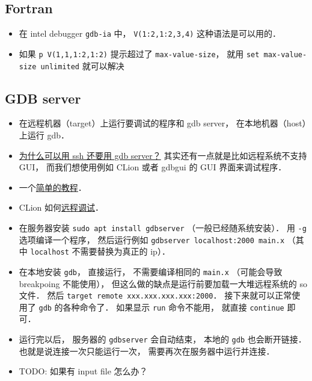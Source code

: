 \subsection{Fortran}
\begin{itemize}
\item 在 intel debugger \verb`gdb-ia` 中， \verb`V(1:2,1:2,3,4)` 这种语法是可以用的．
\item 如果 \verb`p V(1,1,1:2,1:2)` 提示超过了 \verb`max-value-size`， 就用 \verb`set max-value-size unlimited` 就可以解决
\end{itemize}

\subsection{GDB server}
\begin{itemize}
\item 在远程机器（target）上运行要调试的程序和 gdb server， 在本地机器（host）上运行 gdb．
\item \href{https://stackoverflow.com/questions/69176457/the-difference-between-gdbserver-and-remote-gdb}{为什么可以用 ssh 还要用 gdb server？} 其实还有一点就是比如远程系统不支持 GUI， 而我们想使用例如 CLion 或者 gdbgui 的 GUI 界面来调试程序．
\item 一个\href{https://www.thegeekstuff.com/2014/04/gdbserver-example/}{简单的教程}．
\item CLion 如何\href{https://www.jetbrains.com/help/clion/remote-debug.html}{远程调试}．
\item 在服务器安装 \verb|sudo apt install gdbserver| （一般已经随系统安装）． 用 \verb|-g| 选项编译一个程序， 然后运行例如 \verb|gdbserver localhost:2000 main.x| （其中 \verb|localhost| 不需要替换为真正的 ip）．
\item 在本地安装 \verb|gdb|， 直接运行， 不需要编译相同的 \verb|main.x| （可能会导致 breakpoing 不能使用）， 但这么做的缺点是运行前要加载一大堆远程系统的 so 文件． 然后 \verb|target remote xxx.xxx.xxx.xxx:2000|． 接下来就可以正常使用了 \verb|gdb| 的各种命令了． 如果显示 \verb|run| 命令不能用， 就直接 \verb|continue| 即可．
\item 运行完以后， 服务器的 \verb|gdbserver| 会自动结束， 本地的 \verb|gdb| 也会断开链接． 也就是说连接一次只能运行一次， 需要再次在服务器中运行并连接．
\item TODO: 如果有 input file 怎么办？
\end{itemize}

